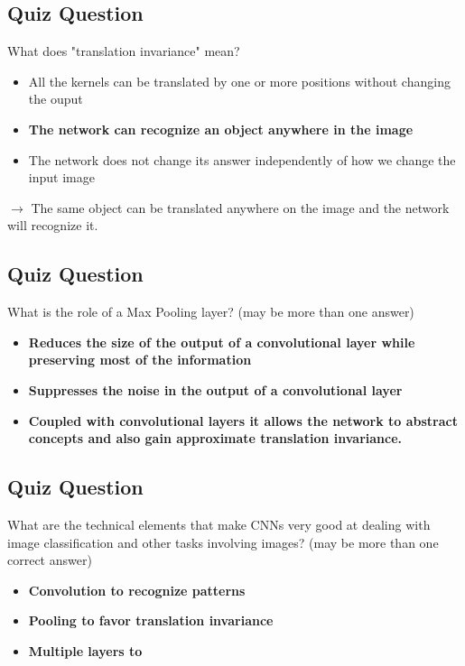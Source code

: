 \subsection{Quiz Question}

What does "translation invariance" mean?
\begin{itemize}
    \item All the kernels can be translated by one or more positions without changing the ouput
    \item \textbf{The network can recognize an object anywhere in the image}
    \item The network does not change its answer independently of how we change the input image
\end{itemize}
\(\rightarrow\) The same object can be translated anywhere on the image and the network will recognize it.


\subsection{Quiz Question}

What is the role of a Max Pooling layer? (may be more than one answer)
\begin{itemize}
    \item \textbf{Reduces the size of the output of a convolutional layer while preserving most of the information}
    \item \textbf{Suppresses the noise in the output of a convolutional layer}
    \item \textbf{Coupled with convolutional layers it allows the network to abstract concepts and also gain approximate translation invariance.}
\end{itemize}

\subsection{Quiz Question}

What are the technical elements that make CNNs very good at dealing with image classification and other tasks involving images? (may be more than one correct answer)
\begin{itemize}
    \item \textbf{Convolution to recognize patterns}
    \item \textbf{Pooling to favor translation invariance}
    \item \textbf{Multiple layers to}
\end{itemize}


